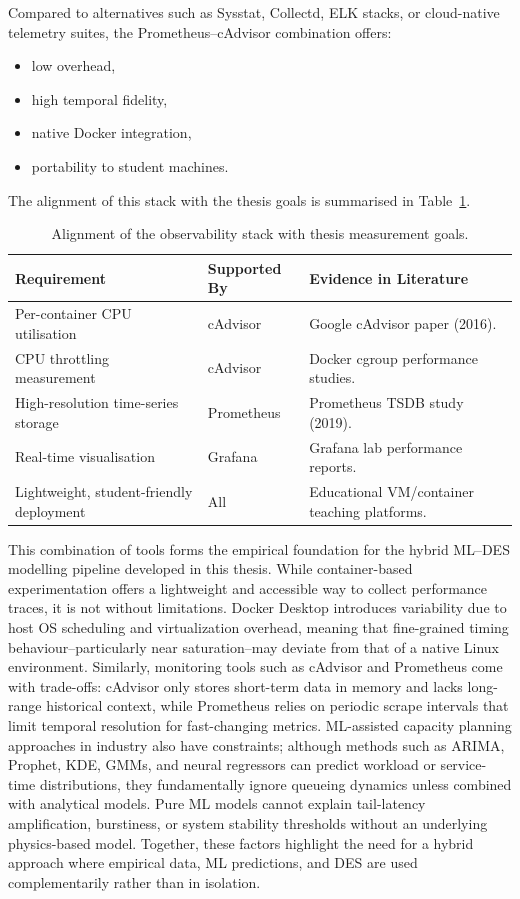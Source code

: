 Compared to alternatives such as Sysstat, Collectd, ELK stacks, or
cloud-native telemetry suites, the Prometheus--cAdvisor combination offers:

\begin{itemize}
    \item low overhead,
    \item high temporal fidelity,
    \item native Docker integration,
    \item portability to student machines.
\end{itemize}

The alignment of this stack with the thesis goals is summarised in
Table~\ref{tab:observability_stack}.

\begin{table}[h]
\centering
\begin{tabular}{l l p{5cm}}
\hline
\textbf{Requirement} & \textbf{Supported By} & \textbf{Evidence in Literature} \\
\hline
Per-container CPU utilisation &
cAdvisor &
Google cAdvisor paper (2016). \\
CPU throttling measurement &
cAdvisor &
Docker cgroup performance studies. \\
High-resolution time-series storage &
Prometheus &
Prometheus TSDB study (2019). \\
Real-time visualisation &
Grafana &
Grafana lab performance reports. \\
Lightweight, student-friendly deployment &
All &
Educational VM/container teaching platforms. \\
\hline
\end{tabular}
\caption{Alignment of the observability stack with thesis measurement goals.}
\label{tab:observability_stack}
\end{table}

This combination of tools forms the empirical foundation for the hybrid
ML--DES modelling pipeline developed in this thesis. While container-based experimentation offers a lightweight and accessible way to collect performance traces, it is not without limitations. Docker Desktop introduces variability due to host OS scheduling and virtualization overhead, meaning that fine-grained timing behaviour--particularly near saturation--may deviate from that of a native Linux environment. Similarly, monitoring tools such as cAdvisor and Prometheus come with trade-offs: cAdvisor only stores short-term data in memory and lacks long-range historical context, while Prometheus relies on periodic scrape intervals that limit temporal resolution for fast-changing metrics. ML-assisted capacity planning approaches in industry also have constraints; although methods such as ARIMA, Prophet, KDE, GMMs, and neural regressors can predict workload or service-time distributions, they fundamentally ignore queueing dynamics unless combined with analytical models. Pure ML models cannot explain tail-latency amplification, burstiness, or system stability thresholds without an underlying physics-based model. Together, these factors highlight the need for a hybrid approach where empirical data, ML predictions, and DES are used complementarily rather than in isolation.


